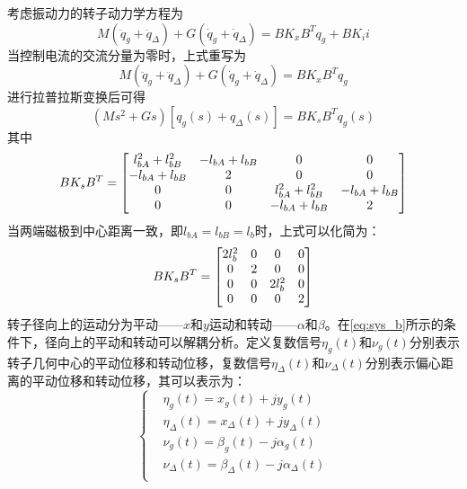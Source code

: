 \documentclass[
  lang=cn,
  degree=master,
  openany,oneside
]{nuaathesis}
\begin{document}
考虑振动力的转子动力学方程为
\begin{equation}
M\left( {{{\ddot q}_g} + {{{\ddot q}}_\Delta }} \right) + G\left( {{{\dot q}_{g}} + {{{\dot q}}_\Delta }} \right) = {B}{K_x}{{B}^{T}}{{q}_g} + {B}{{K}_{i}}{i}
\end{equation}
当控制电流的交流分量为零时，上式重写为
\begin{equation}
M\left( {{{\ddot q}_g} + {{{\ddot q}}_\Delta }} \right) + G\left( {{{\dot q}_{g}} + {{{\dot q}}_\Delta }} \right) = {B}{K_x}{{B}^{T}}{{q}_g}
\end{equation}
进行拉普拉斯变换后可得
\begin{equation}
\left( {M{s^2} + Gs} \right)\left[ {{q_g}\left( s \right) + {q_\Delta }\left( s \right)} \right] =  B{{K}_{s}}{{B}^{T}}{{q}_g}\left( s \right)
\end{equation}
其中
\begin{equation}
{B}{K_s}{{B}^{T}} = \left[ {\begin{matrix}
   {l_{bA}^2 + l_{bB}^2} & { - {l_{bA}} + {l_{bB}}} & 0 & 0  \cr 
   { - {l_{bA}} + {l_{bB}}} & 2 & 0 & 0  \cr 
   0 & 0 & {l_{bA}^2 + l_{bB}^2} & { - {l_{bA}} + {l_{bB}}}  \cr 
   0 & 0 & { - {l_{bA}} + {l_{bB}}} & 2  \cr 
 \end{matrix} } \right]
\end{equation}
当两端磁极到中心距离一致，即${l_{bA}} = {l_{bB}} = {l_b}$时，上式可以化简为：
\begin{equation}
\label{eq:sys_b}
{B}{K_s}{{B}^{T}} = \left[ {\begin{matrix}
   {2l_b^2} & 0 & 0 & 0  \cr 
   0 & 2 & 0 & 0  \cr 
   0 & 0 & {2l_b^2} & 0  \cr 
   0 & 0 & 0 & 2  \cr 

 \end{matrix} } \right]
\end{equation}
转子径向上的运动分为平动——$x$和$y$运动和转动——$\alpha$和$\beta$。在\autoref{eq:sys_b}所示的条件下，径向上的平动和转动可以解耦分析。定义复数信号$\eta _g(t)$和$\nu _g(t)$分别表示转子几何中心的平动位移和转动位移，复数信号$\eta _{\Delta}(t)$和$\nu _{\Delta}(t)$分别表示偏心距离的平动位移和转动位移，其可以表示为：
\begin{equation}
\label{eq:decouple_define}
\left\{
\begin{aligned}
& \eta _g(t) = x_g(t) + jy_g(t)\\
& \eta _{\Delta}(t) = x_{\Delta}(t) + jy_{\Delta}(t)\\
& \nu _g(t) = {\beta}_g(t) - j{\alpha}_g(t)\\
& \nu _{\Delta}(t) = {\beta}_{\Delta}(t) - j{\alpha}_{\Delta}(t)\\
\end{aligned}
\right.
\end{equation}
\end{document}
